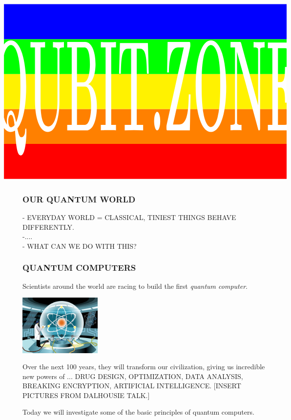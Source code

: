 \documentclass[aspectratio=169]{beamer}
\begin{document}
{
\begin{frame}
\vspace{-20pt}
\[
\hspace{-2cm}
\begin{tikzpicture}[xscale=1.2, yscale=1.8]
\foreach \x/\y in {0/red,1/orange,2/yellow,3/green,4/blue} {
  \path [fill=\y] (0,\x) rectangle +(\textwidth,1);
}
\path [use as bounding box] (current bounding box.south west) rectangle (current bounding box.north east);
\node [scale=2.5, white, yscale=3.04] at (0.5*\textwidth,2.29) {\Huge\bf QUBIT.ZONE};
\end{tikzpicture}
\hspace{-2cm}
\]

\end{frame}
}

\addtocounter{framenumber}{-1}




\begin{frame}
\frametitle{OUR QUANTUM WORLD}
- EVERYDAY WORLD = CLASSICAL, TINIEST THINGS BEHAVE DIFFERENTLY.\\
-....\\
- WHAT CAN WE DO WITH THIS?
\end{frame}
\begin{frame}
\frametitle{QUANTUM COMPUTERS}

\begin{minipage}{0.5\textwidth}\raggedright
Scientists around the world are racing to build the first \textit{quantum computer}.
\end{minipage}
\begin{minipage}{0.4\textwidth}\raggedright
\includegraphics[height=3cm]{images/quantum_atom_in_room.png}
\end{minipage}

\vspace{15pt}
Over the next 100 years, they will transform our civilization, giving us incredible new powers of ... DRUG DESIGN, OPTIMIZATION, DATA ANALYSIS, BREAKING ENCRYPTION, ARTIFICIAL INTELLIGENCE. [INSERT PICTURES FROM DALHOUSIE TALK.]

\vspace{15pt}
Today we will investigate some of the basic principles of quantum computers.

\end{frame}
\end{document}

